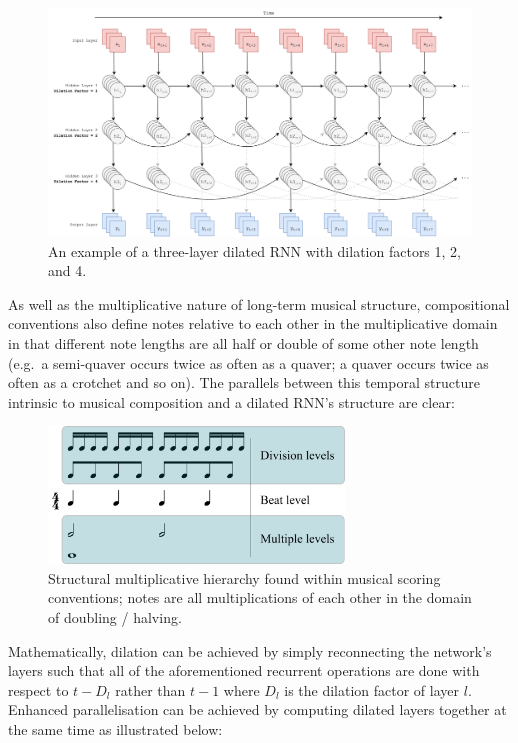 \documentclass[12pt,]{article}
\begin{document}
\begin{figure}
\centering
\includegraphics[width=1\textwidth,height=\textheight]{Images/dilatedrnn.png}
\caption{An example of a three-layer dilated RNN with dilation factors
1, 2, and 4.}
\end{figure}

As well as the multiplicative nature of long-term musical structure,
compositional conventions also define notes relative to each other in
the multiplicative domain in that different note lengths are all half or
double of some other note length (e.g.~a semi-quaver occurs twice as
often as a quaver; a quaver occurs twice as often as a crotchet and so
on). The parallels between this temporal structure intrinsic to musical
composition and a dilated RNN's structure are clear:

\begin{figure}
\centering
\includegraphics[width=0.7\textwidth,height=\textheight]{Images/Metric_levels.png}
\caption{Structural multiplicative hierarchy found within musical
scoring conventions; notes are all multiplications of each other in the
domain of doubling / halving.}
\end{figure}

Mathematically, dilation can be achieved by simply reconnecting the
network's layers such that all of the aforementioned recurrent
operations are done with respect to \(t-D_l\) rather than \(t-1\) where
\(D_l\) is the dilation factor of layer \(l\). Enhanced parallelisation
can be achieved by computing dilated layers together at the same time as
illustrated below:
\end{document}
